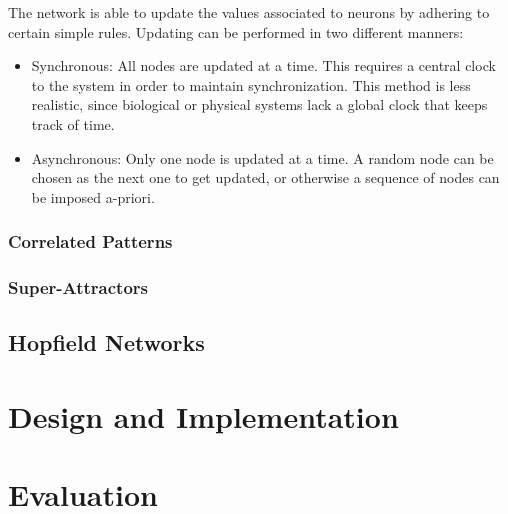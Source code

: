 \documentclass[11pt,a4paper,oneside]{report}
\begin{document}
The network is able to update the values associated to neurons by adhering to certain simple rules. Updating can be performed in two different manners:
\begin{itemize}
 \item Synchronous: All nodes are updated at a time. This requires a central clock to the system in order to maintain synchronization. This method is less realistic, since biological or physical systems lack a global clock that keeps track of time. 
 \item Asynchronous: Only one node is updated at a time. A random node can be chosen as the next one to get updated, or otherwise a sequence of nodes can be imposed a-priori.
\end{itemize}


\subsection{Correlated Patterns}

\subsection{Super-Attractors}

\section{Hopfield Networks}


\chapter{Design and Implementation}



\chapter{Evaluation}


\end{document}

